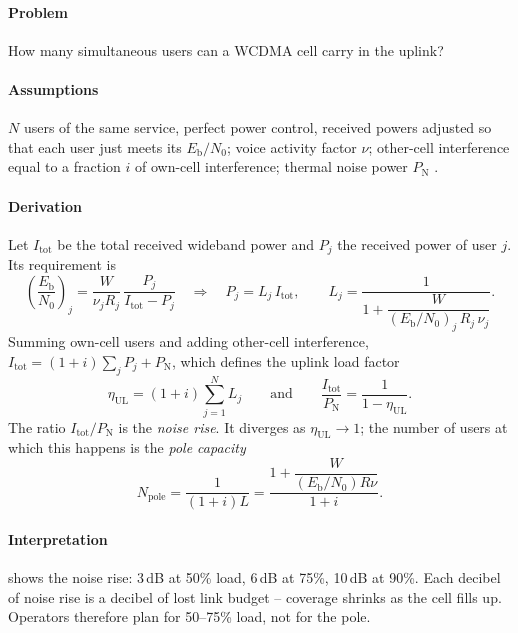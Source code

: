 \documentclass[11pt,a4paper]{article}
\begin{document}
\paragraph{Problem} How many simultaneous users can a WCDMA cell carry in the uplink?
\paragraph{Assumptions} $N$ users of the same service, perfect power control, received powers
adjusted so that each user just meets its $E_\mathrm{b}/N_0$; voice activity factor $\nu$;
other-cell interference equal to a fraction $i$ of own-cell interference; thermal noise
power $P_\mathrm{N}$ \cite{holma2010wcdma}.
\paragraph{Derivation} Let $I_{\mathrm{tot}}$ be the total received wideband power and $P_j$ the
received power of user $j$. Its requirement is
\begin{equation}\label{eq:userreq}
  \left(\frac{E_\mathrm{b}}{N_0}\right)_j = \frac{W}{\nu_j R_j}\,\frac{P_j}{I_{\mathrm{tot}}-P_j}
  \quad\Longrightarrow\quad
  P_j = L_j\,I_{\mathrm{tot}}, \qquad
  L_j = \frac{1}{1+\dfrac{W}{(E_\mathrm{b}/N_0)_j\,R_j\,\nu_j}} .
\end{equation}
Summing own-cell users and adding other-cell interference,
$I_{\mathrm{tot}} = (1+i)\sum_j P_j + P_\mathrm{N}$, which defines the uplink load factor
\begin{equation}\label{eq:load}
  \eta_{\mathrm{UL}} = (1+i)\sum_{j=1}^{N} L_j
  \qquad\text{and}\qquad
  \frac{I_{\mathrm{tot}}}{P_\mathrm{N}} = \frac{1}{1-\eta_{\mathrm{UL}}} .
\end{equation}
The ratio $I_{\mathrm{tot}}/P_\mathrm{N}$ is the \emph{noise rise}. It diverges as
$\eta_{\mathrm{UL}}\to1$; the number of users at which this happens is the \emph{pole capacity}
\begin{equation}\label{eq:pole}
  N_{\mathrm{pole}} = \frac{1}{(1+i)L} = \frac{1+\dfrac{W}{(E_\mathrm{b}/N_0)R\nu}}{1+i}.
\end{equation}
\paragraph{Interpretation}  shows the noise rise: 3\,dB at 50\% load, 6\,dB at 75\%,
10\,dB at 90\%. Each decibel of noise rise is a decibel of lost link budget -- coverage shrinks
as the cell fills up. Operators therefore plan for 50--75\% load, not for the pole.
\end{document}
